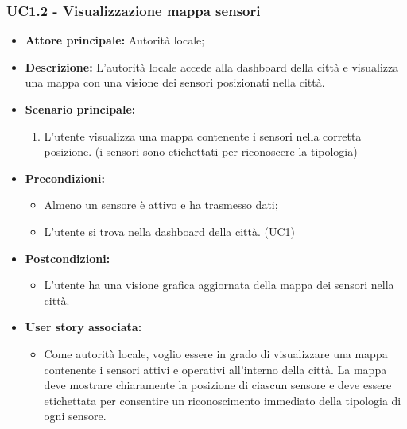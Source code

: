 \documentclass{article}
\begin{document}
\subsubsection{UC1.2 - Visualizzazione mappa sensori}
\begin{itemize}
    \item \textbf{Attore principale:} Autorità locale;
    \item \textbf{Descrizione:} L'autorità locale accede alla dashboard della città e visualizza una mappa con una visione dei sensori posizionati nella città.
    \item \textbf{Scenario principale:}
          \begin{enumerate}
              \item L'utente visualizza una mappa contenente i sensori nella corretta posizione. (i sensori sono etichettati per riconoscere la tipologia)
          \end{enumerate}
    \item \textbf{Precondizioni:}
          \begin{itemize}
              \item  Almeno un sensore è attivo e ha trasmesso dati;
              \item L'utente si trova nella dashboard della città. (UC1)
          \end{itemize}
    \item \textbf{Postcondizioni:}
          \begin{itemize}
              \item      L'utente ha una visione grafica aggiornata della mappa dei sensori nella città.
          \end{itemize}
    \item \textbf{User story associata:}
          \begin{itemize}
              \item Come autorità locale, voglio essere in grado di visualizzare una mappa contenente i sensori attivi e operativi all'interno della città. La mappa deve mostrare chiaramente la posizione di ciascun sensore e deve essere etichettata per consentire un riconoscimento immediato della tipologia di ogni sensore.
          \end{itemize}
\end{itemize}

\end{document}
